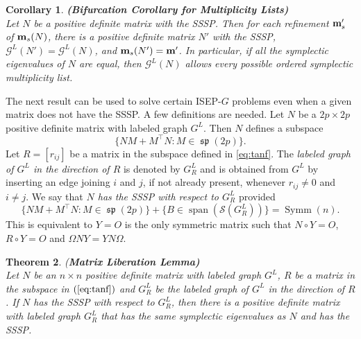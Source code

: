 \documentclass[12pt]{article}
\newtheorem{thm}{Theorem}[section]
\newtheorem{cor}[thm]{Corollary}
\theoremstyle{definition}
\theoremstyle{definition}
\theoremstyle{definition}
\numberwithin{figure}{section}
\numberwithin{equation}{section}
\newcommand{\G}{\mathcal{G}}
\newcommand{\Span}{\operatorname{span}}
\newcommand{\symm}{\operatorname{Symm}}
\newcommand{\spLA}{\operatorname{\mathfrak{sp}}}
\newcommand{\oml}{{\bf m}}
\newcommand{\soml}{{\bf m}_s}
\begin{document}
 
\begin{cor}\label{cor:bifurcationSMP}{\bf (Bifurcation Corollary for Multiplicity Lists)}
\phantom{ } \\
    Let $N$ be a positive definite matrix with the SSSP.  Then for each refinement $\soml'$ of $ \soml(N)$, there is a positive definite matrix $N'$ with the SSSP, { $\G^L(N')=\G^L(N)$,}  and $\soml({N'}) = \oml'$. 
In particular,    if all the symplectic eigenvalues of $N$ are equal, then {$\G^L(N)$}  allows every possible ordered symplectic multiplicity list. 
\end{cor}



The next result can be used to  solve  certain ISEP-$G$ problems even when a given matrix 
does not have the SSSP. 
A few definitions are needed.
Let $N$ be a $2p \times 2p$ positive definite matrix
with labeled graph $G^L$.  Then $N$ defines a subspace
\begin{equation}
\label{eq:tanf}
\{ NM + M^\top N : M \in \spLA(2p) \}. 
\end{equation} 
Let $R=[r_{ij}]$ be a matrix in the subspace defined in \eqref{eq:tanf}.
The \textit{labeled graph of $G^L$ in the direction of $R$} 
is denoted by $G^L_R$ and is obtained from $G^L$ by inserting 
an edge joining $i$ and $j$, if not already present, whenever
$r_{ij} \neq 0$ and $i\neq j$.
We say that \textit{$N$ has the SSSP
with respect to $G^L_R$} provided 
\[ 
 \{NM+ M^\top N\colon M \in \spLA(2p) 
\} + \{ B \in \Span (\mathcal{S}(G^L_R))\}= \symm(n).
\]
This is equivalent to $Y=O$ is the only symmetric matrix such that $N \circ Y=O$, 
$R \circ Y=O$ and $\Omega NY=YN\Omega$.


\begin{thm}\label{liberation}{(\bf Matrix Liberation Lemma)}
\phantom{ } \\
Let $N$ be an $n\times n$ positive definite matrix with labeled graph $G^L$, $R$ be a matrix in {the subspace in} $(\ref{eq:tanf})$ 
and  $G^L_R$ be the labeled graph of {$G^L$} in the direction of $R$.
If $N$ has the SSSP with respect to $G^L_R$, then there is a positive 
definite matrix  with labeled graph  $G^L_R$ that has the same  symplectic eigenvalues as $N$ and has the SSSP. 
\end{thm}
\end{document}
